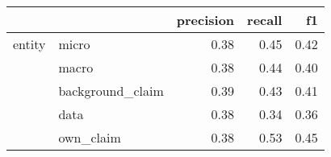 \begin{tabular}{llrrr}
\toprule
       &           &  precision &  recall &   f1 \\
\midrule
entity & micro &       0.38 &    0.45 & 0.42 \\
       & macro &       0.38 &    0.44 & 0.40 \\
       & background\_claim &       0.39 &    0.43 & 0.41 \\
       & data &       0.38 &    0.34 & 0.36 \\
       & own\_claim &       0.38 &    0.53 & 0.45 \\
\bottomrule
\end{tabular}
